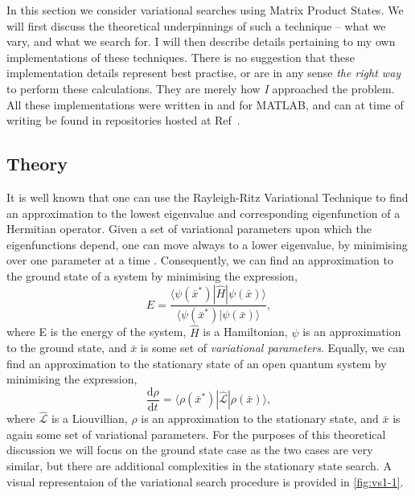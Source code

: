 In this section we consider variational searches using Matrix Product States. We will first discuss the theoretical underpinnings of such a technique -- what we vary, and what we search for. I will then describe details pertaining to my own implementations of these techniques. There is no suggestion that these implementation details represent best practise, or are in any sense \emph{the right way} to perform these calculations. They are merely how \emph{I} approached the problem. All these implementations were written in and for MATLAB, and can at time of writing be found in repositories hosted at Ref~\cite{otb:githome}.
 
 \subsection{Theory}
It is well known that one can use the Rayleigh-Ritz Variational Technique to find an approximation to the lowest eigenvalue and corresponding eigenfunction of a Hermitian operator. Given a set of variational parameters upon which the eigenfunctions depend, one can move always to a lower eigenvalue, by minimising over one parameter at a time \cite{ArfWeb_RRVT, Gasiorowicz_RVT}. Consequently, we can find an approximation to the ground state of a system by minimising the expression,
\begin{equation}
E = \frac{\langle \psi (\bar{x}^{*}) | \hat{H} | \psi (\bar{x}) \rangle}{\langle \psi (\bar{x}^{*}) | \psi (\bar{x}) \rangle},
\label{eq:vs1-1}
\end{equation}
where E is the energy of the system, \(\hat{H}\) is a Hamiltonian, \(\psi\) is an approximation to the ground state, and \( \bar{x} \) is some set of \emph{variational parameters}. Equally, we can find an approximation to the stationary state of an open quantum system by minimising the expression,
\begin{equation}
\frac{\mathrm{d}\rho}{\mathrm{d}t} = \langle \rho(\bar{x}^{*}) | \hat{\mathcal{L}} | \rho(\bar{x}) \rangle,
\label{eq:vs1-2}
\end{equation}
where \(\hat{\mathcal{L}}\) is a Liouvillian, \(\rho\) is an approximation to the stationary state, and \(\bar{x}\) is again some set of variational parameters. For the purposes of this theoretical discussion we will focus on the ground state case as the two cases are very similar, but there are additional complexities in the stationary state search. A visual representaion of the variational search procedure is provided in \cref{fig:vs1-1}.

